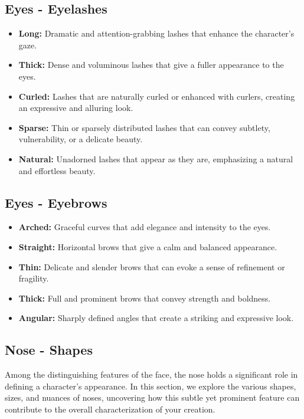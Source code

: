 \documentclass[12pt]{book}
\begin{document}
\subsection{\textbf{Eyes - Eyelashes}}

\begin{itemize}
    \item \textbf{Long:} Dramatic and attention-grabbing lashes that enhance the character's gaze.
    \item \textbf{Thick:} Dense and voluminous lashes that give a fuller appearance to the eyes.
    \item \textbf{Curled:} Lashes that are naturally curled or enhanced with curlers, creating an expressive and alluring look.
    \item \textbf{Sparse:} Thin or sparsely distributed lashes that can convey subtlety, vulnerability, or a delicate beauty.
    \item \textbf{Natural:} Unadorned lashes that appear as they are, emphasizing a natural and effortless beauty.
\end{itemize}

\subsection{\textbf{Eyes - Eyebrows}}

\begin{itemize}
    \item \textbf{Arched:} Graceful curves that add elegance and intensity to the eyes.
    \item \textbf{Straight:} Horizontal brows that give a calm and balanced appearance.
    \item \textbf{Thin:} Delicate and slender brows that can evoke a sense of refinement or fragility.
    \item \textbf{Thick:} Full and prominent brows that convey strength and boldness.
    \item \textbf{Angular:} Sharply defined angles that create a striking and expressive look.
\end{itemize}

\subsection{\textbf{Nose - Shapes}}

Among the distinguishing features of the face, the nose holds a significant role in defining a character's appearance. In this section, we explore the various shapes, sizes, and nuances of noses, uncovering how this subtle yet prominent feature can contribute to the overall characterization of your creation.
\end{document}
